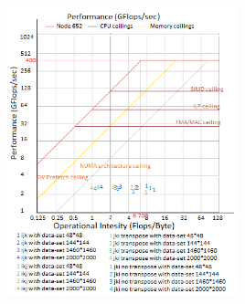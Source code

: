 \documentclass[journal]{IEEEtran}
\begin{document}
\includegraphics[width=0.50\textwidth, left]{roof3.png}



\ifCLASSOPTIONcaptionsoff
  \newpage
\fi






\end{document}
